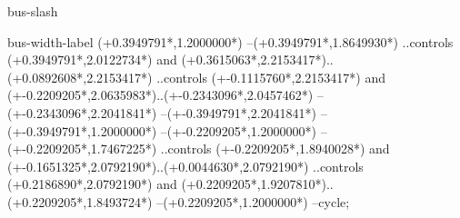 {\begin{scope}[x=1mm,y=1mm,line width=\SCstroke mm,line cap=round,line join=round]
\begin{SCpart}{bus-slash}
    \end{SCpart}
    \begin{SCpart}{bus-width-label}
       ({\SCbusx+0.3949791*\SCscale},{1.2000000*\SCscale})
      --({\SCbusx+0.3949791*\SCscale},{1.8649930*\SCscale})
      ..controls ({\SCbusx+0.3949791*\SCscale},{2.0122734*\SCscale}) and ({\SCbusx+0.3615063*\SCscale},{2.2153417*\SCscale})..({\SCbusx+0.0892608*\SCscale},{2.2153417*\SCscale})
      ..controls ({\SCbusx+-0.1115760*\SCscale},{2.2153417*\SCscale}) and ({\SCbusx+-0.2209205*\SCscale},{2.0635983*\SCscale})..({\SCbusx+-0.2343096*\SCscale},{2.0457462*\SCscale})
      --({\SCbusx+-0.2343096*\SCscale},{2.2041841*\SCscale})
      --({\SCbusx+-0.3949791*\SCscale},{2.2041841*\SCscale})
      --({\SCbusx+-0.3949791*\SCscale},{1.2000000*\SCscale})
      --({\SCbusx+-0.2209205*\SCscale},{1.2000000*\SCscale})
      --({\SCbusx+-0.2209205*\SCscale},{1.7467225*\SCscale})
      ..controls ({\SCbusx+-0.2209205*\SCscale},{1.8940028*\SCscale}) and ({\SCbusx+-0.1651325*\SCscale},{2.0792190*\SCscale})..({\SCbusx+0.0044630*\SCscale},{2.0792190*\SCscale})
      ..controls ({\SCbusx+0.2186890*\SCscale},{2.0792190*\SCscale}) and ({\SCbusx+0.2209205*\SCscale},{1.9207810*\SCscale})..({\SCbusx+0.2209205*\SCscale},{1.8493724*\SCscale})
      --({\SCbusx+0.2209205*\SCscale},{1.2000000*\SCscale})
      --cycle;
    \end{SCpart}
  \end{scope}%
}